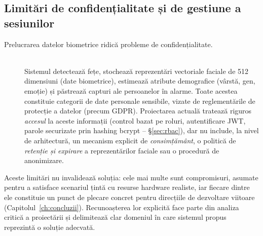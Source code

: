 \documentclass[../../main.tex]{subfiles}
\begin{document}
\subsection{Limitări de confidențialitate și de gestiune a sesiunilor}

\begin{description}
	\item[Prelucrarea datelor biometrice ridică probleme de confidențialitate.] \hfill \\ Sistemul detectează fețe, stochează reprezentări vectoriale faciale de 512 dimensiuni (date biometrice), estimează atribute demografice (vârstă, gen, emoție) și păstrează capturi ale persoanelor în alarme. Toate acestea constituie categorii de date personale sensibile, vizate de reglementările de protecție a datelor (precum GDPR). Proiectarea actuală tratează riguros \emph{accesul} la aceste informații (control bazat pe roluri, autentificare JWT, parole securizate prin hashing bcrypt -- \S\ref{sec:rbac}), dar nu include, la nivel de arhitectură, un mecanism explicit de \emph{consimțământ}, o politică de \emph{retenție și expirare} a reprezentărilor faciale sau o procedură de anonimizare. 
\end{description}

Aceste limitări nu invalidează soluția: cele mai multe sunt compromisuri, asumate pentru a satisface scenariul țintă cu resurse hardware realiste, iar fiecare dintre ele constituie un punct de plecare concret pentru direcțiile de dezvoltare viitoare (Capitolul~\ref{ch:concluzii}). Recunoașterea lor explicită face parte din analiza critică a proiectării și delimitează clar domeniul în care sistemul propus reprezintă o soluție adecvată.
\end{document}
